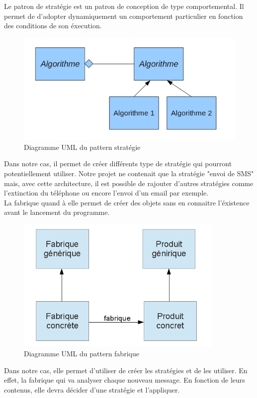 Le patron de stratégie est un patron de conception de type comportemental. Il permet de d'adopter 
dynamiquement un comportement particulier en fonction des conditions de son éxecution.

\begin{figure}[H]
	\center
	\includegraphics[width=12cm]{img/pattern-strategie.png}
	\caption{Diagramme UML du pattern stratégie}
\end{figure}

Dans notre cas, il permet de créer différents type de stratégie qui pourront potentiellement utiliser. 
Notre projet ne contenait que la stratégie "envoi de SMS" mais, avec cette architecture, il est possible 
de rajouter d'autres stratégies comme l'extinction du téléphone ou encore l'envoi d'un email par exemple.
\\


La fabrique quand à elle permet de créer des objets sans en connaitre l'éxistence avant le lancement du 
programme.

\begin{figure}[H]
	\center
	\includegraphics[width=10cm]{img/fabrique.png}
	\caption{Diagramme UML du pattern fabrique}
\end{figure}

Dans notre cas, elle permet d'utiliser de créer les stratégies et de les utiliser. En effet, la fabrique 
qui va analyser chaque nouveau message. En fonction de leurs contenus, elle devra décider d'une stratégie
et l'appliquer.


